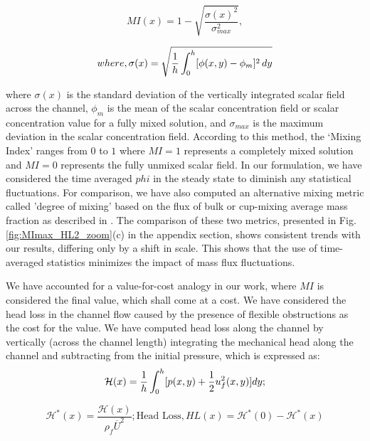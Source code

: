 \documentclass[reprint,a4paper,fleqn]{cas-dc} %
\begin{document}
		\begin{equation}
			MI(x)=1-\sqrt{\frac{\sigma(x)^2}{{\sigma^2_{max}}}},
		\end{equation}
		
		
		\begin{equation}
			where, \sigma(x)=\sqrt{{1\over h} \int_{0}^{h} [\phi(x,y)-\phi_m]^2 \,dy}
		\end{equation}
		
		
		where $\sigma(x)$ is the standard deviation of the vertically integrated scalar field across the channel, $\phi_m$ is the mean of the scalar concentration field or scalar concentration value for a fully mixed solution, and $\sigma_{max}$ is the maximum deviation in the scalar concentration field. According to this method, the `Mixing Index' ranges from $0$ to $1$ where $MI=1$ represents a completely mixed solution and $MI=0$ represents the fully unmixed scalar field. 
		In our formulation, we have considered the time averaged $phi$ in the steady state to diminish any statistical fluctuations. For comparison, we have also computed an alternative mixing metric called 'degree of mixing' based on the flux of bulk or cup-mixing average mass fraction as described in \cite{Antognoli, Orsi, Galletti}. The comparison of these two metrics, presented in Fig. \ref{fig:MImax_HL2_zoom}(c) in the appendix section, shows consistent trends with our results, differing only by a shift in scale. This shows that the use of time-averaged statistics minimizes the impact of mass flux fluctuations.
		
		We have accounted for a value-for-cost analogy in our work, where $MI$ is considered the final value, which shall come at a cost. We have considered the head loss in the channel flow caused by the presence of flexible obstructions as the cost for the value. We have computed head loss along the channel by vertically (across the channel length) integrating the mechanical head along the channel and subtracting from the initial pressure, which is expressed as:
		\begin{equation}
			\mathcal{H}(x)=\frac{1}{h}\int_{0}^{h}[p(x,y)+{1\over2}  u_f^2(x,y)]dy;  
		\end{equation}
		
		\begin{equation}
			\mathcal{H}^*(x)=\frac{\mathcal{H}(x)}{\rho_f \overline{U}^2}; \text{Head Loss}, HL(x) = \mathcal{H}^*(0)-\mathcal{H}^*(x)
		\end{equation}
		
\end{document}
